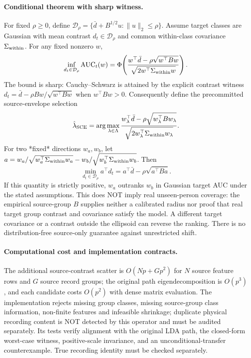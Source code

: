 \paragraph{Conditional theorem with sharp witness.}
For fixed $\rho\ge0$, define
$\mathcal D_\rho=\{\bar d+B^{1/2}u:\|u\|_2\le\rho\}$.
Assume target classes are Gaussian with mean contrast $d_t\in
\mathcal D_\rho$ and common within-class covariance
$\Sigma_{\rm within}$. For any fixed nonzero $w$,
\[
 \inf_{d_t\in\mathcal D_\rho}
   \operatorname{AUC}_t(w)
 =\Phi\!\left(
  {w^\top\bar d-\rho\sqrt{w^\top Bw}
    \over\sqrt{2w^\top\Sigma_{\rm within}w}}\right).
\]
The bound is sharp: Cauchy--Schwarz is attained by the explicit
contrast witness $d_t=\bar d-\rho Bw/\sqrt{w^\top Bw}$
when $w^\top Bw>0$. Consequently define the precommitted
source-envelope selection
\[
\hat\lambda_{\rm SCE}=\arg\max_{\lambda\in\Lambda}
{w_\lambda^\top\bar d-\rho\sqrt{w_\lambda^\top B w_\lambda}
    \over\sqrt{2w_\lambda^\top\Sigma_{\rm within}w_\lambda}}.
\]
For two *fixed* directions $w_a,w_b$, let
$a=w_a/\sqrt{w_a^\top\Sigma_{\rm within}w_a}-
  w_b/\sqrt{w_b^\top\Sigma_{\rm within}w_b}$.
Then
\[
 \min_{d_t\in\mathcal D_\rho}a^\top d_t
 =a^\top\bar d-\rho\sqrt{a^\top Ba}.
\]
If this quantity is strictly positive, $w_a$ outranks $w_b$
in Gaussian target AUC under the stated assumptions.
This does NOT imply real unseen-person coverage: the empirical
source-group $B$ supplies neither a calibrated radius nor proof
that real target group contrast and covariance satisfy the model.
A different target covariance or a contrast outside the ellipsoid
can reverse the ranking. There is no distribution-free source-only
guarantee against unrestricted shift.

\paragraph{Computational cost and implementation contracts.}
The additional source-contrast scatter is
$O(Np+Gp^2)$ for $N$ source feature rows and $G$ source
record groups; the original path eigendecomposition is $O(p^3)$,
and each candidate costs $O(p^2)$ with dense matrix evaluation.
The implementation rejects missing group classes, missing
source-group class information, non-finite
features and infeasible shrinkage; duplicate physical recording
content is NOT detected by this operator and must be audited separately.
Its tests verify alignment with
the original LDA path, the closed-form worst-case witness,
positive-scale invariance, and an unconditional-transfer
counterexample. True recording identity must be checked separately.

